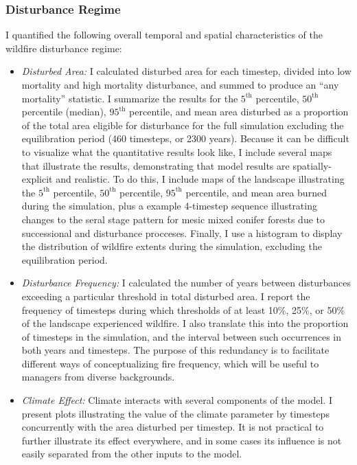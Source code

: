 \subsubsection*{Disturbance Regime} I quantified the following overall temporal and spatial characteristics of the wildfire disturbance regime:
\begin{itemize}
	\item \emph{Disturbed Area:} I calculated disturbed area for each timestep, divided into low mortality and high mortality disturbance, and summed to produce an ``any mortality'' statistic. I summarize the results for the $5^{\text{th}}$ percentile, $50^{\text{th}}$ percentile (median), $95^{\text{th}}$ percentile, and mean area disturbed as a proportion of the total area eligible for disturbance for the full simulation excluding the equilibration period (460 timesteps, or 2300 years). Because it can be difficult to visualize what the quantitative results look like, I include several maps that illustrate the results, demonstrating that model results are spatially-explicit and realistic. To do this, I include maps of the landscape illustrating the $5^{\text{th}}$ percentile, $50^{\text{th}}$ percentile, $95^{\text{th}}$ percentile, and mean area burned during the simulation, plus a example 4-timestep sequence illustrating changes to the seral stage pattern for mesic mixed conifer forests due to successional and disturbance procceses. Finally, I use a histogram to display the distribution of wildfire extents during the simulation, excluding the equilibration period.
	\item \emph{Disturbance Frequency:} I calculated the number of years between disturbances exceeding a particular threshold in total disturbed area. I report the frequency of timesteps during which thresholds of at least 10\%, 25\%, or 50\% of the landscape experienced wildfire. I also translate this into the proportion of timesteps in the simulation, and the interval between such occurrences in both years and timesteps. The purpose of this redundancy is to facilitate different ways of conceptualizing fire frequency, which will be useful to managers from diverse backgrounds.
	\item \emph{Climate Effect:} Climate interacts with several components of the model. I present plots illustrating the value of the climate parameter by timesteps concurrently with the area disturbed per timestep. It is not practical to further illustrate its effect everywhere, and in some cases its influence is not easily separated from the other inputs to the model. 

\end{itemize}
